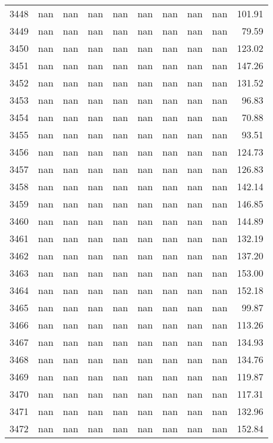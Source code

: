\begin{tabular}{lrrrrrrrrr}
3448 & nan & nan & nan & nan & nan & nan & nan & nan & 101.91 \\
3449 & nan & nan & nan & nan & nan & nan & nan & nan & 79.59 \\
3450 & nan & nan & nan & nan & nan & nan & nan & nan & 123.02 \\
3451 & nan & nan & nan & nan & nan & nan & nan & nan & 147.26 \\
3452 & nan & nan & nan & nan & nan & nan & nan & nan & 131.52 \\
3453 & nan & nan & nan & nan & nan & nan & nan & nan & 96.83 \\
3454 & nan & nan & nan & nan & nan & nan & nan & nan & 70.88 \\
3455 & nan & nan & nan & nan & nan & nan & nan & nan & 93.51 \\
3456 & nan & nan & nan & nan & nan & nan & nan & nan & 124.73 \\
3457 & nan & nan & nan & nan & nan & nan & nan & nan & 126.83 \\
3458 & nan & nan & nan & nan & nan & nan & nan & nan & 142.14 \\
3459 & nan & nan & nan & nan & nan & nan & nan & nan & 146.85 \\
3460 & nan & nan & nan & nan & nan & nan & nan & nan & 144.89 \\
3461 & nan & nan & nan & nan & nan & nan & nan & nan & 132.19 \\
3462 & nan & nan & nan & nan & nan & nan & nan & nan & 137.20 \\
3463 & nan & nan & nan & nan & nan & nan & nan & nan & 153.00 \\
3464 & nan & nan & nan & nan & nan & nan & nan & nan & 152.18 \\
3465 & nan & nan & nan & nan & nan & nan & nan & nan & 99.87 \\
3466 & nan & nan & nan & nan & nan & nan & nan & nan & 113.26 \\
3467 & nan & nan & nan & nan & nan & nan & nan & nan & 134.93 \\
3468 & nan & nan & nan & nan & nan & nan & nan & nan & 134.76 \\
3469 & nan & nan & nan & nan & nan & nan & nan & nan & 119.87 \\
3470 & nan & nan & nan & nan & nan & nan & nan & nan & 117.31 \\
3471 & nan & nan & nan & nan & nan & nan & nan & nan & 132.96 \\
3472 & nan & nan & nan & nan & nan & nan & nan & nan & 152.84 \\

\end{tabular}
